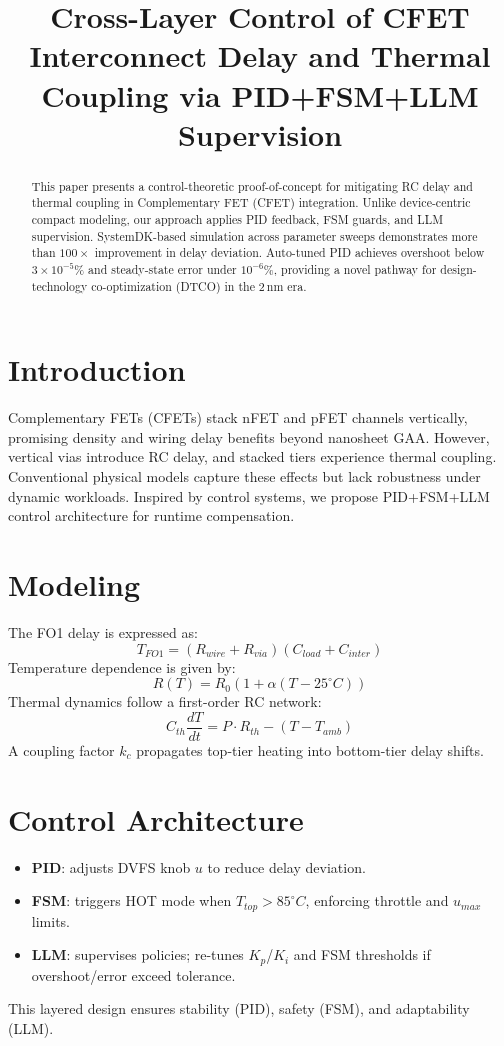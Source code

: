 \documentclass[conference]{IEEEtran}
\title{Cross-Layer Control of CFET Interconnect Delay and Thermal Coupling via PID+FSM+LLM Supervision}
\author{
  \IEEEauthorblockN{Shinichi Samizo}
  \IEEEauthorblockA{Independent Semiconductor Researcher\\
  Email: \href{mailto:shin3t72@gmail.com}{shin3t72@gmail.com}}
}
\begin{document}
\maketitle

\begin{abstract}
This paper presents a control-theoretic proof-of-concept
for mitigating RC delay and thermal coupling in Complementary FET (CFET) integration.
Unlike device-centric compact modeling, our approach applies PID feedback, FSM guards,
and LLM supervision. SystemDK-based simulation across parameter sweeps demonstrates
more than $100\times$ improvement in delay deviation. Auto-tuned PID achieves overshoot
below $3\times 10^{-5}\%$ and steady-state error under $10^{-6}\%$, providing a novel pathway
for design-technology co-optimization (DTCO) in the 2\,nm era.
\end{abstract}

\section{Introduction}
Complementary FETs (CFETs) stack nFET and pFET channels vertically,
promising density and wiring delay benefits beyond nanosheet GAA.
However, vertical vias introduce RC delay, and stacked tiers experience
thermal coupling. Conventional physical models capture these effects
but lack robustness under dynamic workloads. Inspired by control systems,
we propose PID+FSM+LLM control architecture for runtime compensation.

\section{Modeling}
The FO1 delay is expressed as:
\begin{equation}
T_{FO1} = (R_{wire}+R_{via})(C_{load}+C_{inter})
\end{equation}
Temperature dependence is given by:
\begin{equation}
R(T) = R_0 \left(1 + \alpha (T-25^\circ C)\right)
\end{equation}
Thermal dynamics follow a first-order RC network:
\begin{equation}
C_{th}\frac{dT}{dt} = P\cdot R_{th} - (T - T_{amb})
\end{equation}
A coupling factor $k_c$ propagates top-tier heating into bottom-tier delay shifts.

\section{Control Architecture}
\begin{itemize}
  \item \textbf{PID}: adjusts DVFS knob $u$ to reduce delay deviation.
  \item \textbf{FSM}: triggers HOT mode when $T_{top} > 85^\circ C$, enforcing throttle and $u_{max}$ limits.
  \item \textbf{LLM}: supervises policies; re-tunes $K_p$/$K_i$ and FSM thresholds if overshoot/error exceed tolerance.
\end{itemize}
This layered design ensures stability (PID), safety (FSM), and adaptability (LLM).
\end{document}
